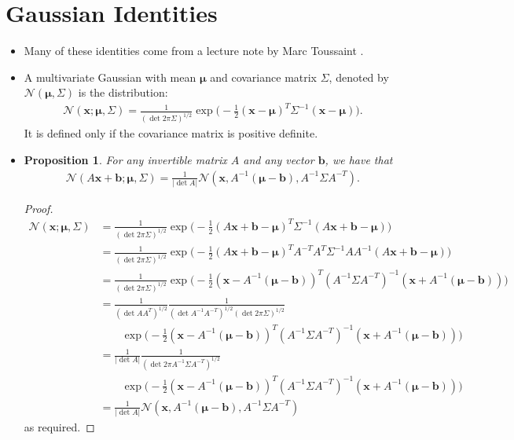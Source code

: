 \documentclass[10pt]{article}
\newtheorem{proposition}[lemma]{Proposition}
\newcommand{\ve}[1]{\mathbf{#1}}
\newcommand{\ves}[1]{\boldsymbol{#1}}
\newcommand{\N}{\mathcal{N}}
\begin{document}
\appendix

\section{Gaussian Identities}

\begin{itemize}
  \item Many of these identities come from a lecture note by Marc Toussaint \cite{Toussaint:2011}.
  
  \item A multivariate Gaussian with mean $\ves{\mu}$ and covariance matrix $\Sigma$, denoted by $\N(\ves{\mu},\Sigma)$ is the distribution:
  \begin{align*}
  \N(\ve{x}; \ves{\mu}, \Sigma) = \frac{1}{(\det 2\pi\Sigma)^{1/2}} \exp\bigg(-\frac{1}{2} (\ve{x}-\ves{\mu})^T \Sigma^{-1} (\ve{x}-\ves{\mu}) \bigg).
  \end{align*}
  It is defined only if the covariance matrix is positive definite.  
  
  \item \begin{proposition} \label{thm:gaussian-linear-transform}
    For any invertible matrix $A$ and any vector $\ve{b}$, we have that
    \begin{align*}
    \N(A\ve{x} + \ve{b}; \ves{\mu}, \Sigma) = \frac{1}{|\det A|} \N(\ve{x}, A^{-1}(\ves{\mu} - \ve{b}), A^{-1}\Sigma A^{-T}).
    \end{align*}
  \end{proposition}

  \begin{proof}
    \begin{align*}
    \N(\ve{x}; \ves{\mu}, \Sigma) 
    &= \frac{1}{(\det 2\pi\Sigma)^{1/2}} \exp\bigg(-\frac{1}{2} (A\ve{x} + \ve{b} -\ves{\mu})^T \Sigma^{-1} (A\ve{x} + \ve{b} -\ves{\mu}) \bigg) \\
    &= \frac{1}{(\det 2\pi\Sigma)^{1/2}} \exp\bigg(-\frac{1}{2} (A\ve{x} + \ve{b} -\ves{\mu})^T A^{-T} A^T \Sigma^{-1} A A^{-1} (A\ve{x} + \ve{b} -\ves{\mu}) \bigg) \\
    &= \frac{1}{(\det 2\pi\Sigma)^{1/2}} \exp\bigg(-\frac{1}{2} (\ve{x} - A^{-1}(\ves{\mu} - \ve{b}))^T (A^{-1} \Sigma A^{-T})^{-1} (\ve{x} + A^{-1}(\ves{\mu} - \ve{b})) \bigg) \\
    &= \frac{1}{(\det AA^T)^{1/2}} \frac{1}{ (\det A^{-1}A^{-T})^{1/2} (\det 2\pi\Sigma)^{1/2}} \\
    & \qquad \exp\bigg(-\frac{1}{2} (\ve{x} - A^{-1}(\ves{\mu} - \ve{b}))^T (A^{-1} \Sigma A^{-T})^{-1} (\ve{x} + A^{-1}(\ves{\mu} - \ve{b})) \bigg) \\
    &= \frac{1}{|\det A|} \frac{1}{ (\det 2\pi A^{-1}\Sigma A^{-T})^{1/2}} \\
    & \qquad \exp\bigg(-\frac{1}{2} (\ve{x} - A^{-1}(\ves{\mu} - \ve{b}))^T (A^{-1} \Sigma A^{-T})^{-1} (\ve{x} + A^{-1}(\ves{\mu} - \ve{b})) \bigg) \\
    &= \frac{1}{|\det A|} \N(\ve{x}, A^{-1}(\ves{\mu} - \ve{b}), A^{-1}\Sigma A^{-T})
    \end{align*}
    as required.
  \end{proof}  


\end{itemize}
\end{document}
